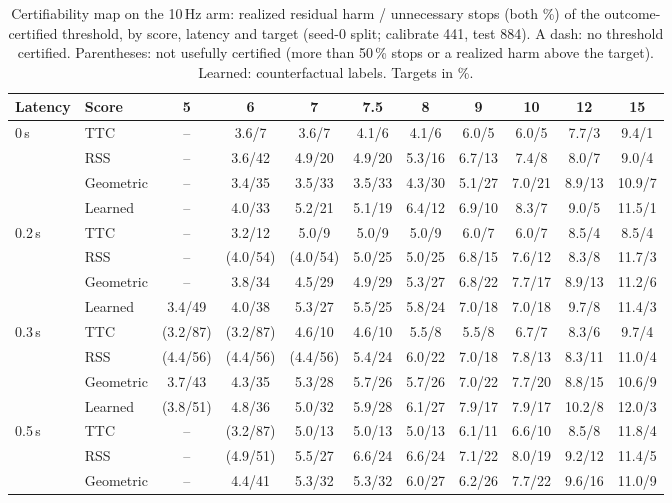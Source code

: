 \documentclass[lettersize,journal]{IEEEtran}
\begin{document}
\begin{table}[t]
\caption{Certifiability map on the 10\,Hz arm: realized residual harm / unnecessary stops (both \%) of the outcome-certified threshold, by score, latency and target (seed-0 split; calibrate 441, test 884). A dash: no threshold certified. Parentheses: not usefully certified (more than 50\,\% stops or a realized harm above the target). Learned: counterfactual labels. Targets in \%.}
\label{tab:s-map}
\centering
\scriptsize\setlength{\tabcolsep}{4pt}
\begin{tabular}{llccccccccc}
\toprule
Latency & Score & 5 & 6 & 7 & 7.5 & 8 & 9 & 10 & 12 & 15 \\
\midrule
0\,s & TTC & -- & 3.6/7 & 3.6/7 & 4.1/6 & 4.1/6 & 6.0/5 & 6.0/5 & 7.7/3 & 9.4/1 \\
 & RSS & -- & 3.6/42 & 4.9/20 & 4.9/20 & 5.3/16 & 6.7/13 & 7.4/8 & 8.0/7 & 9.0/4 \\
 & Geometric & -- & 3.4/35 & 3.5/33 & 3.5/33 & 4.3/30 & 5.1/27 & 7.0/21 & 8.9/13 & 10.9/7 \\
 & Learned & -- & 4.0/33 & 5.2/21 & 5.1/19 & 6.4/12 & 6.9/10 & 8.3/7 & 9.0/5 & 11.5/1 \\
\midrule
0.2\,s & TTC & -- & 3.2/12 & 5.0/9 & 5.0/9 & 5.0/9 & 6.0/7 & 6.0/7 & 8.5/4 & 8.5/4 \\
 & RSS & -- & (4.0/54) & (4.0/54) & 5.0/25 & 5.0/25 & 6.8/15 & 7.6/12 & 8.3/8 & 11.7/3 \\
 & Geometric & -- & 3.8/34 & 4.5/29 & 4.9/29 & 5.3/27 & 6.8/22 & 7.7/17 & 8.9/13 & 11.2/6 \\
 & Learned & 3.4/49 & 4.0/38 & 5.3/27 & 5.5/25 & 5.8/24 & 7.0/18 & 7.0/18 & 9.7/8 & 11.4/3 \\
\midrule
0.3\,s & TTC & (3.2/87) & (3.2/87) & 4.6/10 & 4.6/10 & 5.5/8 & 5.5/8 & 6.7/7 & 8.3/6 & 9.7/4 \\
 & RSS & (4.4/56) & (4.4/56) & (4.4/56) & 5.4/24 & 6.0/22 & 7.0/18 & 7.8/13 & 8.3/11 & 11.0/4 \\
 & Geometric & 3.7/43 & 4.3/35 & 5.3/28 & 5.7/26 & 5.7/26 & 7.0/22 & 7.7/20 & 8.8/15 & 10.6/9 \\
 & Learned & (3.8/51) & 4.8/36 & 5.0/32 & 5.9/28 & 6.1/27 & 7.9/17 & 7.9/17 & 10.2/8 & 12.0/3 \\
\midrule
0.5\,s & TTC & -- & (3.2/87) & 5.0/13 & 5.0/13 & 5.0/13 & 6.1/11 & 6.6/10 & 8.5/8 & 11.8/4 \\
 & RSS & -- & (4.9/51) & 5.5/27 & 6.6/24 & 6.6/24 & 7.1/22 & 8.0/19 & 9.2/12 & 11.4/5 \\
 & Geometric & -- & 4.4/41 & 5.3/32 & 5.3/32 & 6.0/27 & 6.2/26 & 7.7/22 & 9.6/16 & 11.0/9 \\

\end{tabular}
\end{table}
\end{document}
